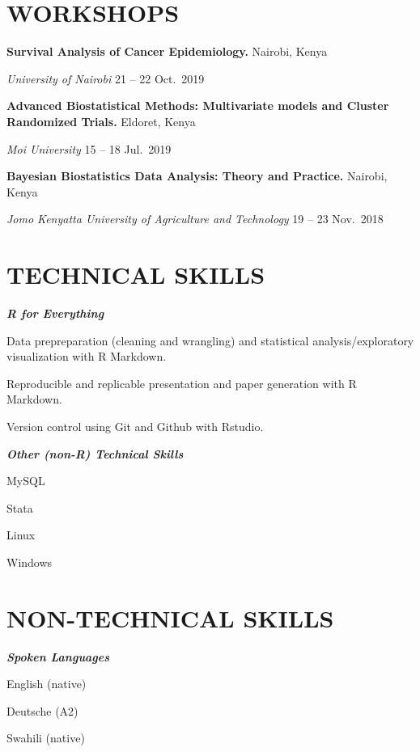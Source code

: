 \documentclass[13pt,]{article}
\providecommand{\tightlist}{%
  \setlength{\itemsep}{0pt}\setlength{\parskip}{0pt}}
\renewenvironment{itemize}{
  \begin{list}{}{
    \setlength{\leftmargin}{1.5em}
  }
}{
  \end{list}
}
\begin{document}
\hypertarget{workshops}{%
\section{\texorpdfstring{\textbf{WORKSHOPS}}{WORKSHOPS}}\label{workshops}}

\textbf{Survival Analysis of Cancer Epidemiology. } \hfill Nairobi,
Kenya

\emph{University of Nairobi} \hfill 21 -- 22 Oct.~2019

\textbf{Advanced Biostatistical Methods: Multivariate models and Cluster
Randomized Trials. } \hfill Eldoret, Kenya

\emph{Moi University} \hfill 15 -- 18 Jul.~2019

\textbf{Bayesian Biostatistics Data Analysis: Theory and Practice. }
\hfill Nairobi, Kenya

\emph{Jomo Kenyatta University of Agriculture and Technology} \hfill 19
-- 23 Nov.~2018

\hypertarget{technical-skills}{%
\section{\texorpdfstring{\textbf{TECHNICAL
SKILLS}}{TECHNICAL SKILLS}}\label{technical-skills}}

\emph{\textbf{R for Everything}}

\begin{itemize}
\tightlist
\item
  Data prepreparation (cleaning and wrangling) and statistical
  analysis/exploratory visualization with R Markdown.
\item
  Reproducible and replicable presentation and paper generation with R
  Markdown.
\item
  Version control using Git and Github with Rstudio.
\end{itemize}

\emph{\textbf{Other (non-R) Technical Skills}}

\begin{itemize}
\tightlist
\item
  MySQL
\item
  Stata
\item
  Linux
\item
  Windows
\end{itemize}

\hypertarget{non-technical-skills}{%
\section{\texorpdfstring{\textbf{NON-TECHNICAL
SKILLS}}{NON-TECHNICAL SKILLS}}\label{non-technical-skills}}

\emph{\textbf{Spoken Languages}}

\begin{itemize}
\tightlist
\item
  English (native)
\item
  Deutsche (A2)
\item
  Swahili (native)
\end{itemize}
\end{document}
